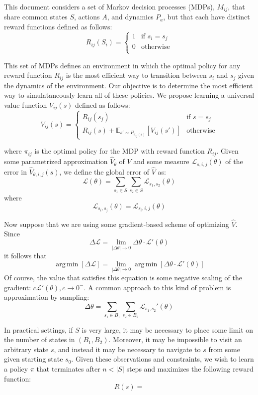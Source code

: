\documentclass{article}
\DeclareMathOperator*{\argmin}{arg\,min}
\begin{document}
This document considers a set of Markov decision processes (MDPs), $M_{ij}$, that share common states $S$, actions $A$, and dynamics $P_a$, but that each have distinct reward functions defined as follows:
\[
  R_{ij}(S_i) = 
  \begin{cases}
    1 & \text{if } s_i = s_j \\ 
    0 & \text{otherwise} \\ 
  \end{cases}
\]

This set of MDPs defines an environment in which the optimal policy for any reward function $R_{ij}$ is the most efficient way to transition between $s_i$ and $s_j$ given the dynamics of the environment. Our objective is to determine the most efficient way to simulataneously learn all of these policies. We propose learning a universal value function $V_{ij}(s)$ defined as follows:
\[ 
V_{ij}(s) = 
  \begin{cases}
    R_{ij}(s_j) & \text{if } s = s_j \\ 
    R_{ij}(s) + \mathbb{E}_{s' \sim P_{\pi_{ij}(s)}}\left [ V_{ij}(s') \right ] & \text{otherwise}
  \end{cases}
\]

where $\pi_{ij}$ is the optimal policy for the MDP with reward function $R_{ij}$. Given some parametrized approximation $\hat{V}_\theta$ of $V$ and some measure $\mathcal{L}_{s,i,j}(\theta)$ of the error in $\hat{V}_{\theta,i,j}(s)$, we define the global error of $\hat{V}$ as:
\[
   \mathcal{L}(\theta) = \sum_{s_1 \in S}\sum_{s_2 \in S}\mathcal{L}_{s_1,s_2}(\theta)
\]
where
\[
   \mathcal{L}_{s_i, s_j}(\theta) = \mathcal{L}_{s_i,i,j}(\theta)
\]


Now suppose that we are using some gradient-based scheme of optimizing $\hat{V}$. Since 
\[
  \Delta \mathcal{L} = \lim_{|\Delta \theta| \to 0}\Delta \theta \cdot \mathcal{L}'(\theta)
\]
it follows that
\[
  \argmin \left[ \Delta \mathcal{L} \right] = \lim_{|\Delta \theta| \to 0}\argmin \left[ \Delta \theta \cdot \mathcal{L}'(\theta) \right]
\]
Of course, the value that satisfies this equation is some negative scaling of the gradient: $c\mathcal{L}'(\theta), c \to 0^-$. A common approach to this kind of problem is approximation by sampling:
\[
  \Delta \theta = \sum_{s_1 \in B_1}\sum_{s_2 \in B_2}\mathcal{L}_{s_1,s_2}'(\theta)
\]

In practical settings, if $S$ is very large, it may be necessary to place some limit on the number of states in $(B_1, B_2)$. Moreover, it may be impossible to visit an arbitrary state $s$, and instead it may be necessary to navigate to $s$ from some given starting state $s_0$. Given these observations and constraints, we wish to learn a policy $\pi$ that terminates after $n < |S|$ steps and maximizes the following reward function:
\[
	R(s) = 
\]
\end{document}
